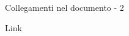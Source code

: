 \begin{frame}[fragile]{Collegamenti nel documento - 2}

\begin{esempio}{Link}
\end{esempio}

\end{frame}